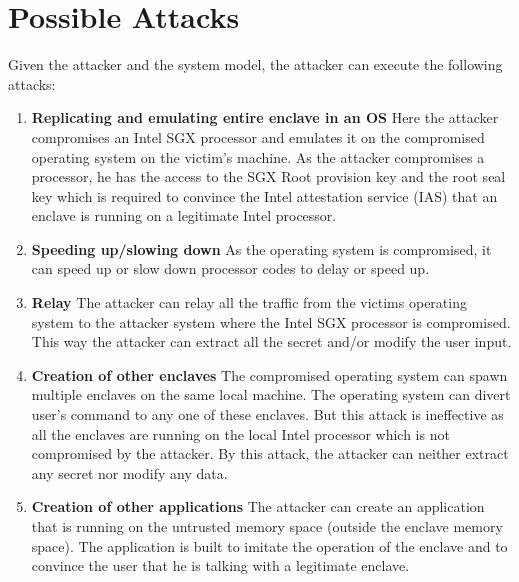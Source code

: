 \section{Possible Attacks}

Given the attacker and the system model, the attacker can execute the following attacks:

\begin{enumerate}
  \item \textbf{Replicating and emulating entire enclave in an OS} Here the attacker compromises an Intel SGX processor and emulates it on the compromised operating system on the victim's machine. As the attacker compromises a processor, he has the access to the SGX Root provision key and the root seal key which is required to convince the Intel attestation service (IAS) that an enclave is running on a legitimate Intel processor.
  \item\textbf{Speeding up/slowing down} As the operating system is compromised, it can speed up or slow down processor codes to delay or speed up.
  \item\textbf{Relay} The attacker can relay all the traffic from the victims operating system to the attacker system where the Intel SGX processor is compromised. This way the attacker can extract all the secret and/or modify the user input.
  \item\textbf{Creation of other enclaves} The compromised operating system can spawn multiple enclaves on the same local machine. The operating system can divert user's command to any one of these enclaves. But this attack is ineffective as all the enclaves are running on the local Intel processor which is not compromised by the attacker. By this attack, the attacker can neither extract any secret nor modify any data.
  \item\textbf{Creation of other applications} The attacker can create an application that is running on the untrusted memory space (outside the enclave memory space). The application is built to imitate the operation of the enclave and to convince the user that he is talking with a legitimate enclave.
\end{enumerate}
